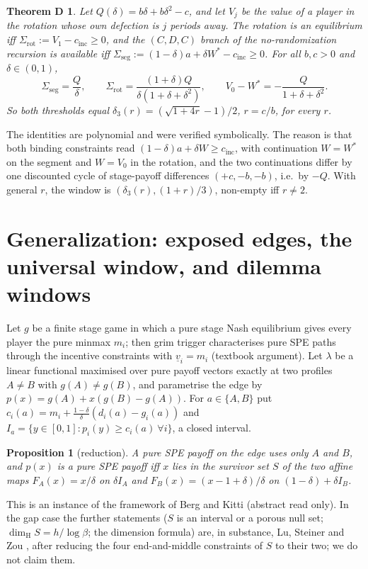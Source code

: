 \documentclass[11pt]{amsart}
\newtheorem{proposition}[theorem]{Proposition}
\newtheorem*{thmD}{Theorem D}
\theoremstyle{remark}
\newcommand{\dimH}{\dim_{\mathrm H}}
\begin{document}
\begin{thmD}
Let $Q(\delta)=b\delta+b\delta^2-c$, and let $V_j$ be the value of a player in the rotation whose own defection is $j$ periods away. The rotation is an equilibrium iff $\Sigma_{\mathrm{rot}}:=V_1-c_{\mathrm{inc}}\ge0$, and the $(C,D,C)$ branch of the no-randomization recursion is available iff $\Sigma_{\mathrm{seg}}:=(1-\delta)a+\delta W^*-c_{\mathrm{inc}}\ge0$. For all $b,c>0$ and $\delta\in(0,1)$,
\[
\Sigma_{\mathrm{seg}}=\frac{Q}{\delta},\qquad \Sigma_{\mathrm{rot}}=\frac{(1+\delta)Q}{\delta(1+\delta+\delta^2)},\qquad V_0-W^*=-\frac{Q}{1+\delta+\delta^2}.
\]
So both thresholds equal $\delta_3(r)=(\sqrt{1+4r}-1)/2$, $r=c/b$, for every $r$.
\end{thmD}

The identities are polynomial and were verified symbolically. The reason is that both binding constraints read $(1-\delta)a+\delta W\ge c_{\mathrm{inc}}$, with continuation $W=W^*$ on the segment and $W=V_0$ in the rotation, and the two continuations differ by one discounted cycle of stage-payoff differences $(+c,-b,-b)$, i.e.\ by $-Q$. With general $r$, the window is $(\delta_3(r),(1+r)/3)$, non-empty iff $r\ne2$.

\section{Generalization: exposed edges, the universal window, and dilemma windows}\label{sec:general}

Let $g$ be a finite stage game in which a pure stage Nash equilibrium gives every player the pure minmax $m_i$; then grim trigger characterises pure SPE paths through the incentive constraints with $\underline v_i=m_i$ (textbook argument). Let $\lambda$ be a linear functional maximised over pure payoff vectors exactly at two profiles $A\ne B$ with $g(A)\ne g(B)$, and parametrise the edge by $p(x)=g(A)+x(g(B)-g(A))$. For $a\in\{A,B\}$ put $c_i(a)=m_i+\frac{1-\delta}{\delta}(d_i(a)-g_i(a))$ and $I_a=\{y\in[0,1]:p_i(y)\ge c_i(a)\ \forall i\}$, a closed interval.

\begin{proposition}[reduction]\label{prop:red}
A pure SPE payoff on the edge uses only $A$ and $B$, and $p(x)$ is a pure SPE payoff iff $x$ lies in the survivor set $S$ of the two affine maps $F_A(x)=x/\delta$ on $\delta I_A$ and $F_B(x)=(x-1+\delta)/\delta$ on $(1-\delta)+\delta I_B$.
\end{proposition}

This is an instance of the framework of Berg and Kitti \cite{BK14} (abstract read only). In the gap case the further statements ($S$ is an interval or a porous null set; $\dimH S=h/\log\beta$; the dimension formula) are, in substance, Lu, Steiner and Zou \cite[Lemma~2.4, Proposition~2.5, Theorem~1.2]{LSZ}, after reducing the four end-and-middle constraints of $S$ to their two; we do not claim them.
\end{document}
